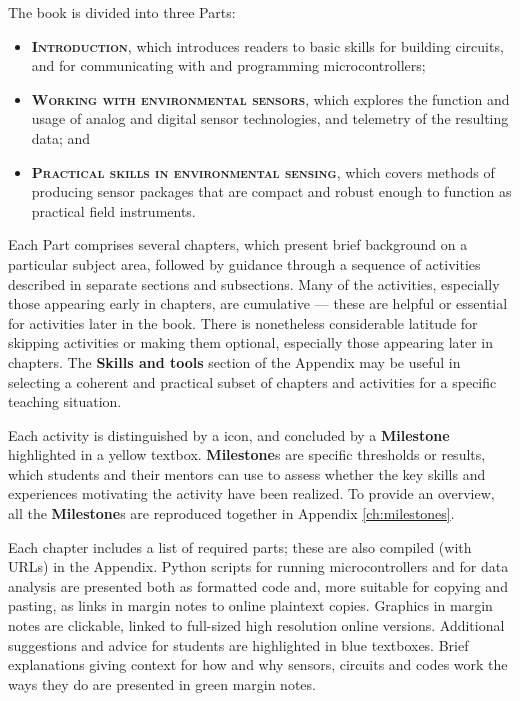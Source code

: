 The book is divided into three Parts:
\begin{itemize}
	\item \textsc{\textbf{Introduction}}, which introduces readers to basic skills for building circuits, and for communicating with and programming microcontrollers;
	\item \textsc{\textbf{Working with environmental sensors}}, which explores the function and usage of analog and digital sensor technologies, and telemetry of the resulting data; and
	\item \textsc{\textbf{Practical skills in environmental sensing}}, which covers methods of producing sensor packages that are compact and robust enough to function as practical field instruments.
\end{itemize}
Each Part comprises several chapters, which present brief background on a particular subject area, followed by guidance through a sequence of activities described in separate sections and subsections. 
Many of the activities, especially those appearing early in chapters, are cumulative --- these are helpful or essential for activities later in the book.
There is nonetheless considerable latitude for skipping activities or making them optional, especially those appearing later in chapters.
The \textbf{Skills and tools} section of the Appendix may be useful in selecting a coherent and practical subset of chapters and activities for a specific teaching situation.

Each activity is distinguished by a \howto icon, and concluded by a \textbf{Milestone} highlighted in a yellow textbox. 
\textbf{Milestone}s are specific thresholds or results, which students and their mentors can use to assess whether the key skills and experiences motivating the activity have been realized. 
To provide an overview, all the \textbf{Milestone}s are reproduced together in Appendix \ref{ch:milestones}.

Each chapter includes a list of required parts; these are also compiled (with URLs) in the Appendix.
Python scripts for running microcontrollers and for data analysis are presented both as formatted code and, more suitable for copying and pasting, as links in margin notes to online plaintext copies.
Graphics in margin notes are clickable, linked to full-sized high resolution online versions.
Additional suggestions and advice for students are highlighted in blue textboxes.
Brief explanations giving context for how and why sensors, circuits and codes work the ways they do are presented in green margin notes.

